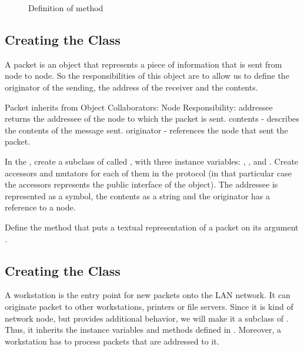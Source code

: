 \begin{figure}[htbp]
\begin{center}
\caption{Definition of  method}
\end{center}
\end{figure}



\subsection*{Creating the Class }

A packet is an object that represents a piece of information that is sent from node to node. So the responsibilities of this object are to allow us to define the originator of the sending, the address of the receiver and the contents.

\begin{scode}
Packet inherits from Object
Collaborators: Node
Responsibility:
addressee returns the addressee of the node to which
the packet is sent.
contents - describes the contents of the message sent.
originator - references the node that sent the packet.
\end{scode}

\exercise  In the , create a subclass of 
called , with three instance variables: ,
, and . Create accessors and mutators
for each of them in the  protocol (in that
particular case the accessors represents the public interface of
the object). The addressee is represented as a symbol, the
contents as a string and the originator has a reference to a node.

\exercise  Define the method  that puts a
textual representation of a packet on its argument
.

\subsection*{Creating the Class }

A workstation is the entry point for new packets onto the LAN
network. It can originate packet to other workstations, printers
or file servers. Since it is kind of network node, but provides
additional behavior, we will make it a subclass of .
Thus, it inherits the instance variables and methods defined in
. Moreover, a workstation has to process packets
that are addressed to it.

